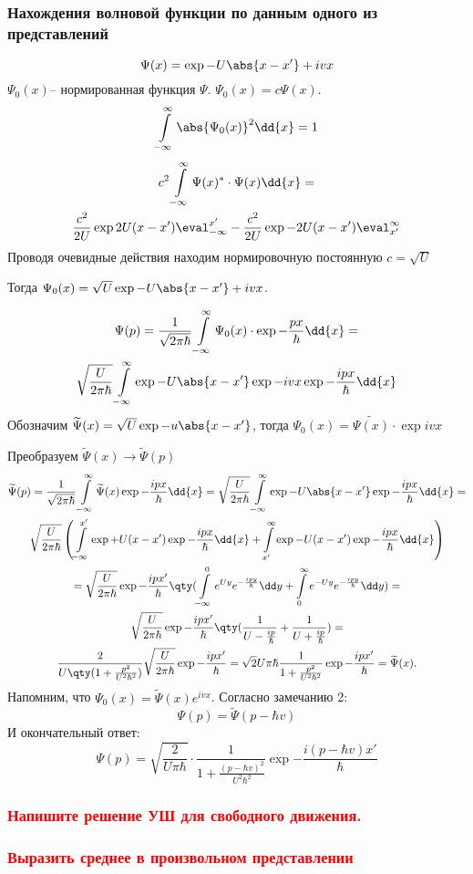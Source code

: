 \subsubsection{Нахождения волновой функции по данным одного из представлений}

$$\Psi(x)= \exp{-U\abs{x-x'} +ivx  }$$
$\Psi_0(x)$-- нормированная функция $\Psi$. $\Psi_0(x)=c\Psi(x)$.
$$\infint \abs{\Psi_0(x)}^2 \dd{x}=1$$
\begin{gather*}
	c^2\infint \Psi(x)^*\cdot\Psi(x)\dd{x}=
	\\ \frac{c^2}{2U}\exp{2U(x-x')}\eval_{-\infty}^{x'}- 
	\frac{c^2}{2U}\exp{-2U(x-x')}
	\eval^{\infty}_{x'}
\end{gather*}
Проводя очевидные действия находим нормировочную постоянную $c=\sqrt{U}$

Тогда $\Psi_0(x)=\sqrt{U}\exp{-U\abs{x-x'}+ivx}$.

\begin{gather*}
\Psi(p)=\frac{1}{\sqrt{2\pi\hbar}}\infint \Psi_0(x)\cdot\exp{-\frac{px}{\hbar}} \dd{x}=\\
\sqrt\frac{U}{2 \pi \hbar } \infint \exp{-U\abs{x-x'}}\exp{-ivx}\exp{-\frac{ipx}{\hbar}} \dd{x}
\end{gather*}
Обозначим $\tilde{\Psi}(x)=\sqrt{U} \exp{-u\abs{x-x'}}$,
 тогда $\Psi_0(x)=\tilde{\Psi(x)}\cdot\exp{ivx}$

Преобразуем $\tilde{\Psi}(x)\longrightarrow \tilde{\Psi}(p)$ 
\begin{gather*}
	\tilde{\Psi}(p)=\frac{1}{\sqrt{2\pi\hbar}}\infint\tilde\Psi(x)\exp{-\frac{ipx}{\hbar}} \dd{x} =\sqrt{\frac{U}{2 \pi \hbar}} \infint \exp{-U\abs{x-x'}}\exp{-\frac{ipx}{\hbar}}\dd{x} =\\
	\sqrt{\frac{U}{2 \pi \hbar}} \left(
	\int\limits_{-\infty}^{x'} \exp{+U (x-x')}\exp{-\frac{ipx}{\hbar}}\dd{x} 
	+
	\int\limits^{\infty}_{x'} \exp{-U (x-x')}\exp{-\frac{ipx}{\hbar}}\dd{x}
	\right)\\=
	\sqrt{\frac{U}{2 \pi \hbar }}\exp{-\frac{ipx' }{\hbar}}
	\qty
	(\int\limits_{-\infty}^0 e^{Uy} e^{-\frac{ipy}{\hbar}}\dd y+
	\int\limits^{\infty}_0 e^{-Uy} e^{-\frac{ipy}{\hbar}}\dd y
	 )
	 =\\
	 \sqrt{\frac{U}{2 \pi \hbar}} \exp{-\frac{ipx' }{\hbar}} 
	 \qty(\frac{1}{U-\frac{ip}{\hbar}} + \frac{1}{U+\frac{ip}{\hbar}})=\\
	 \frac{2}{U\qty(1+\frac{p^2}{U^2\hbar^2})}\sqrt{\frac{U}{2 \pi \hbar}} \exp{-\frac{ipx'}{\hbar}}=\sqrt{2}{U \pi \hbar} \frac{1}{1+\frac{p^2}{U^2\hbar^2}}\exp{-\frac{ipx' }{\hbar}}=\tilde {\Psi}(x). 
\end{gather*}
Напомним, что $\Psi_0(x)=\tilde\Psi(x)e^{ivx}$. Согласно замечанию 2:
	 $$\Psi(p)=\tilde{\Psi}(p-\hbar v)$$
И окончательный ответ:
	 $$\Psi(p)=\sqrt{\frac{2}{U\pi\hbar}}\cdot\frac{1}{1+\frac{(p-\hbar v)^2}{U^2\hbar^2}}\exp{-\frac{i(p-\hbar v)x' }{\hbar}} $$
\subsubsection{\textcolor{red} {Напишите решение УШ для свободного движения.} }

\subsubsection{\textcolor{red} {Выразить среднее в произвольном представлении} }